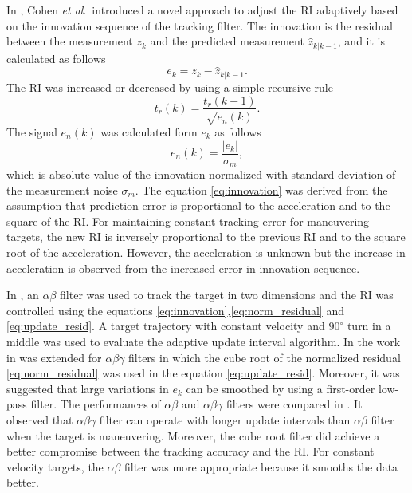 \documentclass[english, 12pt, a4paper, elec, utf8, a-1b, online]{aaltothesis}
\newcommand{\etal}{\textit{et al}.~}
\begin{document}
In \cite{Cohen1986}, Cohen \etal introduced a novel approach to adjust the RI adaptively based on the innovation sequence of the tracking filter.
The innovation is the residual between the measurement $z_k$ and the predicted measurement $\hat{z}_{k|k-1}$, and it is calculated as follows
\begin{equation}\label{eq:innovation}
    e_k = z_k - \hat{z}_{k|k-1}.
\end{equation}
The RI was increased or decreased by using a simple recursive rule 
\begin{equation}\label{eq:update_resid}
    t_r(k) = \frac{t_r(k-1)}{\sqrt{e_n(k)}}.
\end{equation}
The signal $e_n(k)$ was calculated form $e_k$ as follows
\begin{equation}\label{eq:norm_residual}
    e_n(k) = \frac{|e_k|}{\sigma_m},
\end{equation}
which is absolute value of the innovation normalized with standard deviation of the measurement noise $\sigma_m$.
The equation \eqref{eq:innovation} was derived from the assumption that prediction error is proportional to the acceleration and to the square of the RI.
For maintaining constant tracking error for maneuvering targets, the new RI is inversely proportional to the previous RI and to the square root of the acceleration.
However, the acceleration is unknown but the increase in acceleration is observed from the increased error in innovation sequence.

In \cite{Cohen1986}, an $\alpha \beta$ filter was used to track the target in two dimensions and the RI was controlled using the equations \eqref{eq:innovation},\eqref{eq:norm_residual} and \eqref{eq:update_resid}.
A target trajectory with constant velocity and $90^\circ$ turn in a middle was used to evaluate the adaptive update interval algorithm.
In \cite{Gardner1988} the work in \cite{Cohen1986} was extended for $\alpha\beta\gamma$ filters in which the cube root of the normalized residual \eqref{eq:norm_residual} was used in the equation \eqref{eq:update_resid}.
Moreover, it was suggested that large variations in $e_k$ can be smoothed by using a first-order low-pass filter.
The performances of $\alpha\beta$ and $\alpha\beta\gamma$ filters were compared in \cite{Munu1992}.
It observed that $\alpha\beta\gamma$ filter can operate with longer update intervals than $\alpha\beta$ filter when the target is maneuvering.
Moreover, the cube root filter did achieve a better compromise between the tracking accuracy and the RI.     
For constant velocity targets, the $\alpha\beta$ filter was more appropriate because it smooths the data better.
\end{document}
